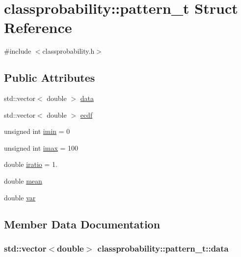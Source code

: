 \hypertarget{structclassprobability_1_1pattern__t}{}\section{classprobability\+:\+:pattern\+\_\+t Struct Reference}
\label{structclassprobability_1_1pattern__t}


{\ttfamily \#include $<$classprobability.\+h$>$}

\subsection*{Public Attributes}
\begin{DoxyCompactItemize}
\item 
std\+::vector$<$ double $>$ \hyperlink{structclassprobability_1_1pattern__t_afb58ab2a0384632d50ce99f3e959da9d}{data}
\item 
std\+::vector$<$ double $>$ \hyperlink{structclassprobability_1_1pattern__t_ac7f434dfe3d1583ff08bb86efc9e47bd}{ecdf}
\item 
unsigned int \hyperlink{structclassprobability_1_1pattern__t_a68b94c4ddf461a91f3dfd4da50748f51}{imin} = 0
\item 
unsigned int \hyperlink{structclassprobability_1_1pattern__t_ad1ad35a4357c8ad04f78e739c4485f83}{imax} = 100
\item 
double \hyperlink{structclassprobability_1_1pattern__t_a2d4c9cdf27a7c43f7b96d6dce990dd55}{iratio} = 1.
\item 
double \hyperlink{structclassprobability_1_1pattern__t_a68544f1b50aefe88c8880ae71d4ab42a}{mean}
\item 
double \hyperlink{structclassprobability_1_1pattern__t_a1077c7811bcaa315e33e0a3e2d6ecfc8}{var}
\end{DoxyCompactItemize}


\subsection{Member Data Documentation}
\subsubsection[{\texorpdfstring{data}{data}}]{\setlength{\rightskip}{0pt plus 5cm}std\+::vector$<$double$>$ classprobability\+::pattern\+\_\+t\+::data}\hypertarget{structclassprobability_1_1pattern__t_afb58ab2a0384632d50ce99f3e959da9d}{}\label{structclassprobability_1_1pattern__t_afb58ab2a0384632d50ce99f3e959da9d}
